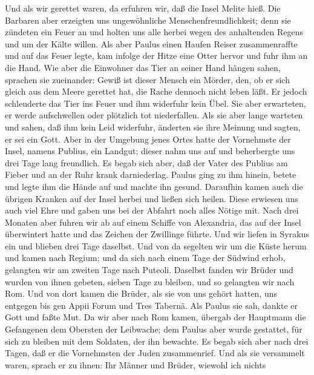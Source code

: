  Und als wir gerettet waren, da erfuhren wir, daß die
Insel Melite hieß.  Die Barbaren aber erzeigten uns
ungewöhnliche Menschenfreundlichkeit; denn sie zündeten ein Feuer an und
holten uns alle herbei wegen des anhaltenden Regens und um der Kälte
willen.  Als aber Paulus einen Haufen Reiser
zusammenraffte und auf das Feuer legte, kam infolge der Hitze eine Otter
hervor und fuhr ihm an die Hand.  Wie aber die Einwohner
das Tier an seiner Hand hängen sahen, sprachen sie zueinander: Gewiß ist
dieser Mensch ein Mörder, den, ob er sich gleich aus dem Meere gerettet
hat, die Rache dennoch nicht leben läßt.  Er jedoch
schleuderte das Tier ins Feuer und ihm widerfuhr kein Übel.
 Sie aber erwarteten, er werde aufschwellen oder plötzlich
tot niederfallen. Als sie aber lange warteten und sahen, daß ihm kein
Leid widerfuhr, änderten sie ihre Meinung und sagten, er sei ein Gott.
 Aber in der Umgebung jenes Ortes hatte der Vornehmste der
Insel, namens Publius, ein Landgut; dieser nahm uns auf und beherbergte
uns drei Tage lang freundlich.  Es begab sich aber, daß
der Vater des Publius am Fieber und an der Ruhr krank darniederlag.
Paulus ging zu ihm hinein, betete und legte ihm die Hände auf und machte
ihn gesund.  Daraufhin kamen auch die übrigen Kranken auf
der Insel herbei und ließen sich heilen.  Diese erwiesen
uns auch viel Ehre und gaben uns bei der Abfahrt noch alles Nötige mit.
 Nach drei Monaten aber fuhren wir ab auf einem Schiffe
von Alexandria, das auf der Insel überwintert hatte und das Zeichen der
Zwillinge führte.  Und wir liefen in Syrakus ein und
blieben drei Tage daselbst.  Und von da segelten wir um
die Küste herum und kamen nach Regium; und da sich nach einem Tage der
Südwind erhob, gelangten wir am zweiten Tage nach Puteoli.
 Daselbst fanden wir Brüder und wurden von ihnen gebeten,
sieben Tage zu bleiben, und so gelangten wir nach Rom. 
Und von dort kamen die Brüder, als sie von uns gehört hatten, uns
entgegen bis gen Appii Forum und Tres Tabernä. Als Paulus sie sah,
dankte er Gott und faßte Mut.  Da wir aber nach Rom
kamen, übergab der Hauptmann die Gefangenen dem Obersten der Leibwache;
dem Paulus aber wurde gestattet, für sich zu bleiben mit dem Soldaten,
der ihn bewachte.  Es begab sich aber nach drei Tagen,
daß er die Vornehmsten der Juden zusammenrief. Und als sie versammelt
waren, sprach er zu ihnen: Ihr Männer und Brüder, wiewohl ich nichts
